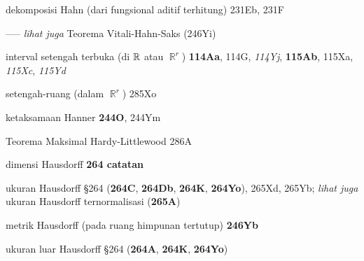 \indexmedskip






















dekomposisi Hahn (dari fungsional aditif terhitung)
231Eb, 231F


----- {\it lihat juga} Teorema Vitali-Hahn-Saks (246Yi)














interval setengah terbuka (di $\Bbb R$ atau $\BbbR^r$) {\bf 114Aa}, 114G,
{\it 114Yj}, {\bf 115Ab}, 115Xa, {\it 115Xc}, {\it 115Yd}

setengah-ruang (dalam $\BbbR^r$) 285Xo


















ketaksamaan Hanner {\bf 244O}, 244Ym




Teorema Maksimal Hardy-Littlewood 286A














dimensi Hausdorff {\bf 264 catatan}






ukuran Hausdorff \S264
({\bf 264C}, {\bf 264Db}, {\bf 264K}, {\bf 264Yo}),
265Xd, 265Yb; 
  {\it lihat juga} ukuran Hausdorff ternormalisasi ({\bf 265A})


metrik Hausdorff (pada ruang himpunan tertutup) {\bf 246Yb}


ukuran luar Hausdorff \S264 ({\bf 264A}, {\bf 264K}, {\bf 264Yo})






